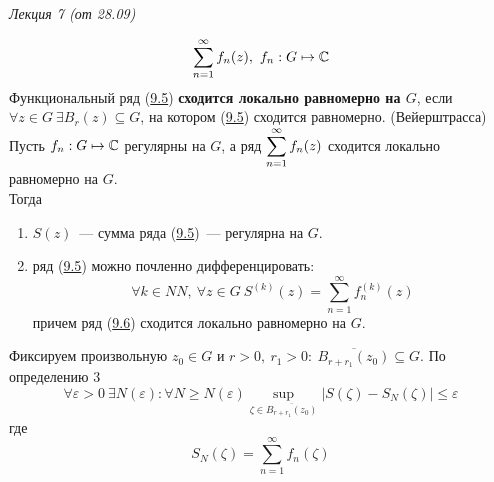 \begin{flushright}
    \textit{Лекция 7 (от 28.09)}
\end{flushright}
\begin{equation}\label{(9.5)}
    \sum_{n=1}^{\infty}f_n(z), \ f_n: G \mapsto \mathbb{C}
\end{equation}
\Def
Функциональный ряд (\href{(9.5)}{9.5}) \textbf{сходится локально равномерно на
  $G$}, если $\forall z \in G \ \exists B_r(z) \subseteq G$, на котором
(\href{(9.5)}{9.5}) сходится равномерно.
\theorem (Вейерштрасса)
Пусть $f_n: G \mapsto \mathbb{C}$ регулярны на $G$, а ряд $\displaystyle
\sum_{n=1}^{\infty}f_n(z)$ сходится локально равномерно на $G$.
\\
Тогда
\begin{enumerate}
    \item $S(z)$~--- сумма ряда (\href{(9.5)}{9.5})~--- регулярна на $G$.
    \item ряд (\href{(9.5)}{9.5}) можно почленно дифференцировать:
    \begin{equation}\label{(9.6)}
        \forall k \in NN, \ \forall z \in G \ S^{(k)}(z) = \sum_{n=1}^{\infty}f^{(k)}_n(z)
    \end{equation}
    причем ряд (\href{(9.6)}{9.6}) сходится локально равномерно на $G$.
\end{enumerate}
\pr
Фиксируем произвольную $z_0 \in G$ и $r>0, \ r_1>0: \ \overline{B_{r+r_1}(z_0)}
\subseteq G$. По определению $3$
\begin{equation}\label{(9.7)}
    \forall \varepsilon > 0 \ \exists N(\varepsilon): \forall N \geq N(\varepsilon) \sup_{\zeta \in \overline{B_{r+r_1}(z_0)}}\left| S(\zeta) - S_N(\zeta) \right| \leq \varepsilon
\end{equation}
где
\begin{equation}\label{(9.8)}
    S_N(\zeta) = \sum_{n=1}^{\infty}f_n(\zeta)
\end{equation}

